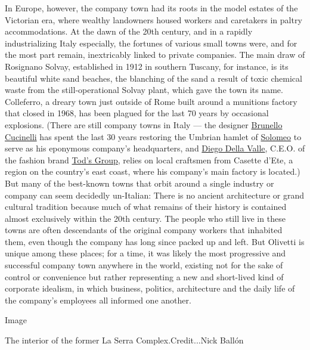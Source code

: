 In Europe, however, the company town had its roots in the model estates
of the Victorian era, where wealthy landowners housed workers and
caretakers in paltry accommodations. At the dawn of the 20th century,
and in a rapidly industrializing Italy especially, the fortunes of
various small towns were, and for the most part remain, inextricably
linked to private companies. The main draw of Rosignano Solvay,
established in 1912 in southern Tuscany, for instance, is its beautiful
white sand beaches, the blanching of the sand a result of toxic chemical
waste from the still-operational Solvay plant, which gave the town its
name. Colleferro, a dreary town just outside of Rome built around a
munitions factory that closed in 1968, has been plagued for the last 70
years by occasional explosions. (There are still company towns in Italy
--- the designer
\href{https://www.nytimes.com/2017/06/15/t-magazine/food/brunello-cucinelli-italian-dinner-party-tips.html}{Brunello
Cucinelli} has spent the last 30 years restoring the Umbrian hamlet of
\href{https://www.nytimes.com/2018/09/21/fashion/brunello-cucinelli-italy.html}{Solomeo}
to serve as his eponymous company's headquarters, and
\href{https://www.nytimes.com/2016/09/23/t-magazine/fashion/diego-della-valle-tods-interview-milan-fashion-week.html}{Diego
Della Valle}, C.E.O. of the fashion brand
\href{https://www.nytimes.com/2015/09/25/t-magazine/tods-shoes-milan-fashion-week.html}{Tod's
Group}, relies on local craftsmen from Casette d'Ete, a region on the
country's east coast, where his company's main factory is located.) But
many of the best-known towns that orbit around a single industry or
company can seem decidedly un-Italian: There is no ancient architecture
or grand cultural tradition because much of what remains of their
history is contained almost exclusively within the 20th century. The
people who still live in these towns are often descendants of the
original company workers that inhabited them, even though the company
has long since packed up and left. But Olivetti is unique among these
places; for a time, it was likely the most progressive and successful
company town anywhere in the world, existing not for the sake of control
or convenience but rather representing a new and short-lived kind of
corporate idealism, in which business, politics, architecture and the
daily life of the company's employees all informed one another.

Image

The interior of the former La Serra Complex.Credit...Nick Ballón

